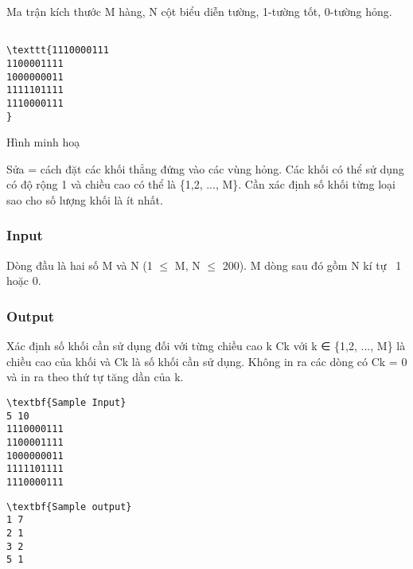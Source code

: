 

Ma trận kích thước M hàng, N cột biểu diễn tường, 1-tường tốt, 0-tường hỏng. 
\begin{verbatim}

\texttt{1110000111
1100001111
1000000011
1111101111
1110000111 
}\end{verbatim}

Hình minh hoạ

Sửa = cách đặt các khối thẳng đứng vào các vùng hỏng. Các khối có thể sử dụng có độ rộng 1 và chiều cao có thể là \{1,2, ..., M\}. Cần xác định số khối từng loại sao cho số lượng khối là ít nhất.

\subsubsection{Input}Dòng đầu là hai số M và N (1  $\le$  M, N  $\le$  200). M dòng sau đó gồm N kí tự  1 hoặc 0. 

\subsubsection{Output}Xác định số khối cần sử dụng đối với từng chiều cao k Ck với k ∈ \{1,2, ..., M\} là chiều cao của khối và Ck là số khối cần sử dụng. Không in ra các dòng có Ck = 0 và in ra theo thứ tự tăng dần của k.
\begin{verbatim}
\textbf{Sample Input}
5 10 
1110000111
1100001111
1000000011
1111101111
1110000111\end{verbatim}
\begin{verbatim}
\textbf{Sample output}
1 7 
2 1 
3 2 
5 1 
\end{verbatim}
